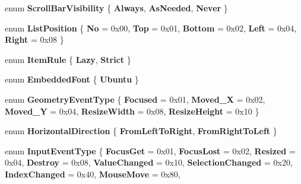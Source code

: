 \begin{DoxyCompactItemize}
enum {\bfseries Scroll\+Bar\+Visibility} \{ {\bfseries Always}, 
{\bfseries As\+Needed}, 
{\bfseries Never}
 \}
\item 
\mbox{\label{namespace_space_v_i_l_1_1_core_ab78d4879986462f91f6ff498033e2b9a}} 
enum {\bfseries List\+Position} \{ \newline
{\bfseries No} = 0x00, 
{\bfseries Top} = 0x01, 
{\bfseries Bottom} = 0x02, 
{\bfseries Left} = 0x04, 
\newline
{\bfseries Right} = 0x08
 \}
\item 
\mbox{\label{namespace_space_v_i_l_1_1_core_afb1402761ff2ee219f93257a0be8d399}} 
enum {\bfseries Item\+Rule} \{ {\bfseries Lazy}, 
{\bfseries Strict}
 \}
\item 
\mbox{\label{namespace_space_v_i_l_1_1_core_a59f0f5c7742adda7fdc0e51c361ae1ac}} 
enum {\bfseries Embedded\+Font} \{ {\bfseries Ubuntu}
 \}
\item 
\mbox{\label{namespace_space_v_i_l_1_1_core_a0af1884788ee8e7521bb374f26672006}} 
enum {\bfseries Geometry\+Event\+Type} \{ \newline
{\bfseries Focused} = 0x01, 
{\bfseries Moved\+\_\+X} = 0x02, 
{\bfseries Moved\+\_\+Y} = 0x04, 
{\bfseries Resize\+Width} = 0x08, 
\newline
{\bfseries Resize\+Height} = 0x10
 \}
\item 
\mbox{\label{namespace_space_v_i_l_1_1_core_a9dfbdc58a7d0d007884288b9b463cce2}} 
enum {\bfseries Horizontal\+Direction} \{ {\bfseries From\+Left\+To\+Right}, 
{\bfseries From\+Right\+To\+Left}
 \}
\item 
\mbox{\label{namespace_space_v_i_l_1_1_core_a10acc8289f9b7afa1e40cdae56d993b6}} 
enum {\bfseries Input\+Event\+Type} \{ \newline
{\bfseries Focus\+Get} = 0x01, 
{\bfseries Focus\+Lost} = 0x02, 
{\bfseries Resized} = 0x04, 
{\bfseries Destroy} = 0x08, 
\newline
{\bfseries Value\+Changed} = 0x10, 
{\bfseries Selection\+Changed} = 0x20, 
{\bfseries Index\+Changed} = 0x40, 
{\bfseries Mouse\+Move} = 0x80, 
\newline

\end{DoxyCompactItemize}
